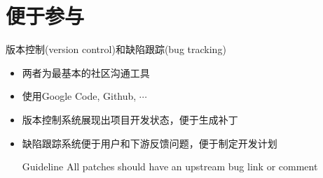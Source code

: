 \documentclass[handout,CJK,xetex]{beamer}
\begin{document}
\section{便于参与}
\begin{frame}{版本控制(version control)和缺陷跟踪(bug tracking)}
  \begin{itemize}[<+->]
  \item 两者为最基本的社区沟通工具
  \item 使用Google Code, Github, $\cdots$
  \item 版本控制系统展现出项目开发状态，便于生成补丁
  \item 缺陷跟踪系统便于用户和下游反馈问题，便于制定开发计划
    \begin{block}{Guideline}
All patches should have an upstream bug link or comment
\end{block}
\end{itemize}
\end{frame}

\end{document}
